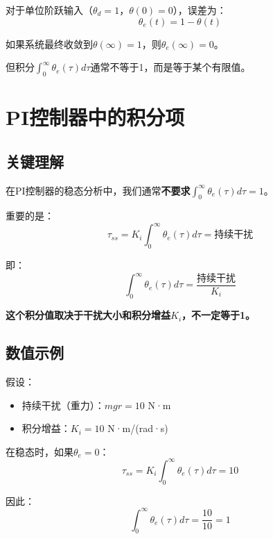 \documentclass[12pt,a4paper]{article}
\begin{document}
对于单位阶跃输入（$\theta_d = 1$，$\theta(0) = 0$），误差为：
\begin{equation}
\theta_e(t) = 1 - \theta(t)
\end{equation}

如果系统最终收敛到$\theta(\infty) = 1$，则$\theta_e(\infty) = 0$。

但积分$\int_0^{\infty} \theta_e(\tau) d\tau$通常不等于1，而是等于某个有限值。

\section{PI控制器中的积分项}

\subsection{关键理解}

在PI控制器的稳态分析中，我们通常\textbf{不要求}$\int_0^{\infty} \theta_e(\tau) d\tau = 1$。

重要的是：
\begin{equation}
\tau_{ss} = K_i \int_0^{\infty} \theta_e(\tau) d\tau = \text{持续干扰}
\end{equation}

即：
\begin{equation}
\int_0^{\infty} \theta_e(\tau) d\tau = \frac{\text{持续干扰}}{K_i}
\end{equation}

\textbf{这个积分值取决于干扰大小和积分增益$K_i$，不一定等于1。}

\subsection{数值示例}

假设：
\begin{itemize}
\item 持续干扰（重力）：$mgr = 10$ N·m
\item 积分增益：$K_i = 10$ N·m/(rad·s)
\end{itemize}

在稳态时，如果$\theta_e = 0$：
\begin{equation}
\tau_{ss} = K_i \int_0^{\infty} \theta_e(\tau) d\tau = 10
\end{equation}

因此：
\begin{equation}
\int_0^{\infty} \theta_e(\tau) d\tau = \frac{10}{10} = 1
\end{equation}
\end{document}
